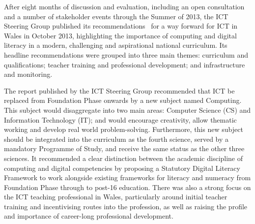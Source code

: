 \documentclass{sig-alternate}
\begin{document}
After eight months of discussion and evaluation, including an open
consultation and a number of stakeholder events through the Summer of
2013, the ICT Steering Group published its
recommendations~\cite{welshictreview:2013} for a way forward for ICT
in Wales in October 2013, highlighting the importance of computing and
digital literacy in a modern, challenging and aspirational national
curriculum. Its headline recommendations were grouped into three main
themes: curriculum and qualifications; teacher training and
professional development; and infrastructure and monitoring.

The report published by the ICT Steering Group
recommended that ICT be replaced from Foundation Phase onwards
by a new subject named Computing.
This subject would disaggregate into two main areas:
Computer Science (CS) and Information Technology (IT);
and would encourage creativity, allow thematic working and develop
real world problem-solving.
Furthermore, this new subject should be integrated into
the curriculum as the fourth science, served by a mandatory Programme
of Study, and receive the same status as the other three sciences. It
recommended a clear distinction between the academic discipline of
computing and digital competencies by proposing a Statutory Digital
Literacy Framework to work alongside existing frameworks for literacy
and numeracy from Foundation Phase through to post-16 education. There
was also a strong focus on the ICT teaching professional in Wales,
particularly around initial teacher training and incentivising routes
into the profession, as well as raising the profile and importance of
career-long professional development.
\end{document}
